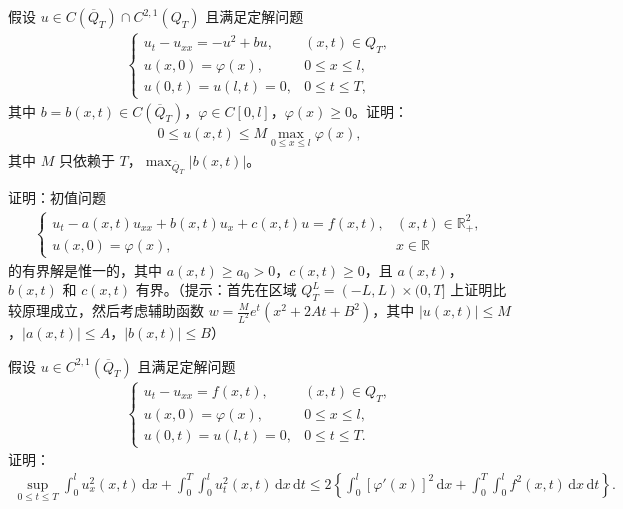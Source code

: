 \documentclass[../../main.tex]{subfiles}%
\begin{document}
\begin{example}
假设 $u\in C(\overline{Q}_T)\cap C^{2,1}(Q_T)$ 且满足定解问题
\begin{align*}
\begin{cases}
u_t-u_{xx}=-u^2+bu, & (x,t)\in Q_T,\\
u(x,0)=\varphi(x), & 0\leqslant x\leqslant l,\\
u(0,t)=u(l,t)=0, & 0\leqslant t\leqslant T,
\end{cases}
\end{align*}
其中 $b=b(x,t)\in C(\overline{Q}_T)$，$\varphi\in C[0,l]$，$\varphi(x)\geqslant 0$。证明：
\begin{align*}
0\leqslant u(x,t)\leqslant M\max_{0\leqslant x\leqslant l}\varphi(x),
\end{align*}
其中 $M$ 只依赖于 $T$，$\max_{\overline{Q}_T}|b(x,t)|$。
\end{example}

\begin{example}
证明：初值问题
\begin{align*}
\begin{cases}
u_t-a(x,t)u_{xx}+b(x,t)u_x+c(x,t)u=f(x,t), & (x,t)\in\mathbb{R}_+^2,\\
u(x,0)=\varphi(x), & x\in\mathbb{R}
\end{cases}
\end{align*}
的有界解是惟一的，其中 $a(x,t)\geqslant a_0>0$，$c(x,t)\geqslant 0$，且 $a(x,t)$，$b(x,t)$ 和 $c(x,t)$ 有界。（提示：首先在区域 $Q_T^L=(-L,L)\times(0,T]$ 上证明比较原理成立，然后考虑辅助函数 $w=\frac{M}{L^2}e^t(x^2+2At+B^2)$，其中 $|u(x,t)|\leqslant M$，$|a(x,t)|\leqslant A$，$|b(x,t)|\leqslant B$）
\end{example}

\begin{example}
假设 $u\in C^{2,1}(\overline{Q}_T)$ 且满足定解问题
\begin{align*}
\begin{cases}
u_t-u_{xx}=f(x,t), & (x,t)\in Q_T,\\
u(x,0)=\varphi(x), & 0\leqslant x\leqslant l,\\
u(0,t)=u(l,t)=0, & 0\leqslant t\leqslant T.
\end{cases}
\end{align*}
证明：
\begin{align*}
\sup_{0\leqslant t\leqslant T}\int_0^l u_x^2(x,t)\,\mathrm{d}x+\int_0^T\int_0^l u_t^2(x,t)\,\mathrm{d}x\,\mathrm{d}t
\leqslant 2\left\{\int_0^l[\varphi'(x)]^2\,\mathrm{d}x+\int_0^T\int_0^l f^2(x,t)\,\mathrm{d}x\,\mathrm{d}t\right\}.
\end{align*}
\end{example}
\end{document}
